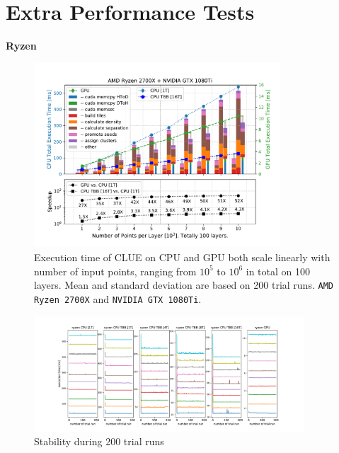 

\newpage

\section{Extra Performance Tests}
\label{sec:clue:extraPerfTests}



\textbf{Ryzen}

\begin{figure}[ht!]
    \centering
    \includegraphics[width=0.82\textwidth]{chapters/HGCal/figures/clue/private/Figure5_1.pdf}
    \caption{Execution time of CLUE on CPU and GPU both scale linearly with number of input points, ranging from $10^5$ to $10^6$ in total on 100 layers. Mean and standard deviation are based on 200 trial runs. \texttt{AMD Ryzen 2700X} and \texttt{NVIDIA GTX 1080Ti}.}
\end{figure}
\begin{figure}[ht!]
    \centering
    \includegraphics[trim=3cm 0cm 3cm 0cm, clip,width=0.9\textwidth]{chapters/HGCal/figures/clue/private/addition_ryzen.pdf}
    \caption{Stability during 200 trial runs}
\end{figure}

